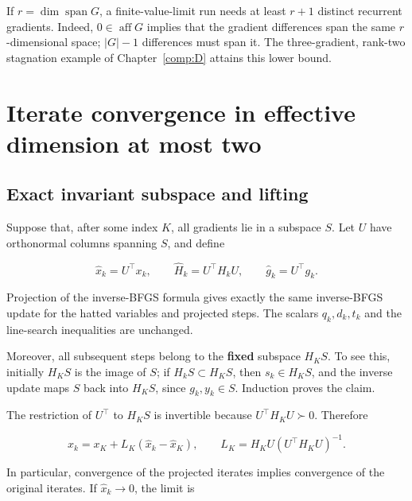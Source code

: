 If \(r=\dim\operatorname{span}G\), a finite-value-limit run needs at
least \(r+1\) distinct recurrent gradients. Indeed,
\(0\in\operatorname{aff}G\) implies that the gradient differences span
the same \(r\)-dimensional space; \(|G|-1\) differences must span it.
The three-gradient, rank-two stagnation example of Chapter~\ref{comp:D} attains this
lower bound.


\setcounter{section}{6}
\setcounter{theorem}{0}
\setcounter{lemma}{0}
\setcounter{corollary}{0}
\setcounter{proposition}{0}
\setcounter{remark}{0}
\setcounter{equation}{0}


\section{Iterate convergence in effective dimension at most
two}\label{H:iterate-convergence-in-effective-dimension-at-most-two}



\subsection{Exact invariant subspace and
lifting}\label{H:exact-invariant-subspace-and-lifting}

Suppose that, after some index \(K\), all gradients lie in a subspace
\(S\). Let \(U\) have orthonormal columns spanning \(S\), and define

\[
\widehat x_k=U^\top x_k,\qquad
\widehat H_k=U^\top H_kU,\qquad
\widehat g_k=U^\top g_k.
\]

Projection of the inverse-BFGS formula gives exactly the same
inverse-BFGS update for the hatted variables and projected steps. The
scalars \(q_k,d_k,t_k\) and the line-search inequalities are unchanged.

Moreover, all subsequent steps belong to the \textbf{fixed} subspace
\(H_KS\). To see this, initially \(H_KS\) is the image of \(S\); if
\(H_kS\subset H_KS\), then \(s_k\in H_KS\), and the inverse update maps
\(S\) back into \(H_KS\), since \(g_k,y_k\in S\). Induction proves the
claim.

The restriction of \(U^\top\) to \(H_KS\) is invertible because
\(U^\top H_KU\succ0\). Therefore

\[
\boxed{
x_k=x_K+L_K(\widehat x_k-\widehat x_K),\qquad
L_K=H_KU(U^\top H_KU)^{-1}.
}
\tag{7.7.1}
\]

In particular, convergence of the projected iterates implies convergence
of the original iterates. If \(\widehat x_k\to0\), the limit is

